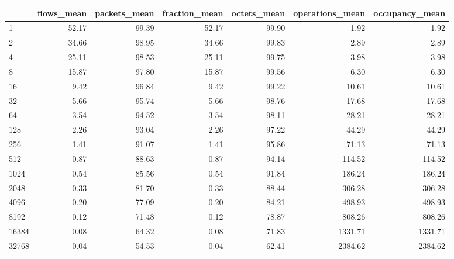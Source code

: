 \begin{tabular}{lrrrrrr}
\toprule
{} &  flows\_mean &  packets\_mean &  fraction\_mean &  octets\_mean &  operations\_mean &  occupancy\_mean \\
\midrule
1        &       52.17 &         99.39 &          52.17 &        99.90 &             1.92 &            1.92 \\
2        &       34.66 &         98.95 &          34.66 &        99.83 &             2.89 &            2.89 \\
4        &       25.11 &         98.53 &          25.11 &        99.75 &             3.98 &            3.98 \\
8        &       15.87 &         97.80 &          15.87 &        99.56 &             6.30 &            6.30 \\
16       &        9.42 &         96.84 &           9.42 &        99.22 &            10.61 &           10.61 \\
32       &        5.66 &         95.74 &           5.66 &        98.76 &            17.68 &           17.68 \\
64       &        3.54 &         94.52 &           3.54 &        98.11 &            28.21 &           28.21 \\
128      &        2.26 &         93.04 &           2.26 &        97.22 &            44.29 &           44.29 \\
256      &        1.41 &         91.07 &           1.41 &        95.86 &            71.13 &           71.13 \\
512      &        0.87 &         88.63 &           0.87 &        94.14 &           114.52 &          114.52 \\
1024     &        0.54 &         85.56 &           0.54 &        91.84 &           186.24 &          186.24 \\
2048     &        0.33 &         81.70 &           0.33 &        88.44 &           306.28 &          306.28 \\
4096     &        0.20 &         77.09 &           0.20 &        84.21 &           498.93 &          498.93 \\
8192     &        0.12 &         71.48 &           0.12 &        78.87 &           808.26 &          808.26 \\
16384    &        0.08 &         64.32 &           0.08 &        71.83 &          1331.71 &         1331.71 \\
32768    &        0.04 &         54.53 &           0.04 &        62.41 &          2384.62 &         2384.62 \\

\end{tabular}
